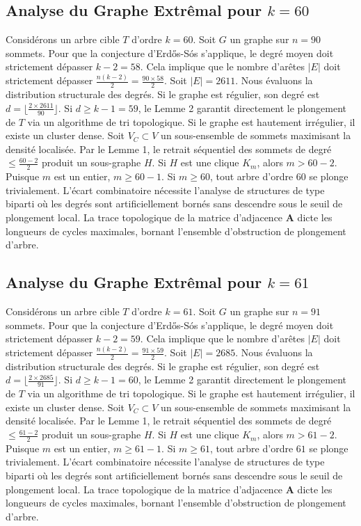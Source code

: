 \documentclass[11pt,a4paper]{article}
\begin{document}
\subsection{Analyse du Graphe Extr\^emal pour $k=60$}
Consid\'erons un arbre cible $T$ d'ordre $k=60$.
Soit $G$ un graphe sur $n=90$ sommets.
Pour que la conjecture d'Erd\H{o}s-S\'os s'applique, le degr\'e moyen doit strictement d\'epasser $k-2 = 58$.
Cela implique que le nombre d'ar\^etes $|E|$ doit strictement d\'epasser $\frac{n(k-2)}{2} = \frac{90 \times 58}{2}$.
Soit $|E| = 2611$.
Nous \'evaluons la distribution structurale des degr\'es. Si le graphe est r\'egulier, son degr\'e est $d = \lfloor \frac{2 \times 2611}{90} \rfloor$.
Si $d \geq k-1 = 59$, le Lemme 2 garantit directement le plongement de $T$ via un algorithme de tri topologique.
Si le graphe est hautement irr\'egulier, il existe un cluster dense. Soit $V_C \subset V$ un sous-ensemble de sommets maximisant la densit\'e localis\'ee.
Par le Lemme 1, le retrait s\'equentiel des sommets de degr\'e $\leq \frac{60-2}{2}$ produit un sous-graphe $H$.
Si $H$ est une clique $K_{m}$, alors $m > 60-2$. Puisque $m$ est un entier, $m \geq 60-1$. Si $m \geq 60$, tout arbre d'ordre $60$ se plonge trivialement.
L'\'ecart combinatoire n\'ecessite l'analyse de structures de type biparti o\`u les degr\'es sont artificiellement born\'es sans descendre sous le seuil de plongement local. La trace topologique de la matrice d'adjacence $\mathbf{A}$ dicte les longueurs de cycles maximales, bornant l'ensemble d'obstruction de plongement d'arbre.


\subsection{Analyse du Graphe Extr\^emal pour $k=61$}
Consid\'erons un arbre cible $T$ d'ordre $k=61$.
Soit $G$ un graphe sur $n=91$ sommets.
Pour que la conjecture d'Erd\H{o}s-S\'os s'applique, le degr\'e moyen doit strictement d\'epasser $k-2 = 59$.
Cela implique que le nombre d'ar\^etes $|E|$ doit strictement d\'epasser $\frac{n(k-2)}{2} = \frac{91 \times 59}{2}$.
Soit $|E| = 2685$.
Nous \'evaluons la distribution structurale des degr\'es. Si le graphe est r\'egulier, son degr\'e est $d = \lfloor \frac{2 \times 2685}{91} \rfloor$.
Si $d \geq k-1 = 60$, le Lemme 2 garantit directement le plongement de $T$ via un algorithme de tri topologique.
Si le graphe est hautement irr\'egulier, il existe un cluster dense. Soit $V_C \subset V$ un sous-ensemble de sommets maximisant la densit\'e localis\'ee.
Par le Lemme 1, le retrait s\'equentiel des sommets de degr\'e $\leq \frac{61-2}{2}$ produit un sous-graphe $H$.
Si $H$ est une clique $K_{m}$, alors $m > 61-2$. Puisque $m$ est un entier, $m \geq 61-1$. Si $m \geq 61$, tout arbre d'ordre $61$ se plonge trivialement.
L'\'ecart combinatoire n\'ecessite l'analyse de structures de type biparti o\`u les degr\'es sont artificiellement born\'es sans descendre sous le seuil de plongement local. La trace topologique de la matrice d'adjacence $\mathbf{A}$ dicte les longueurs de cycles maximales, bornant l'ensemble d'obstruction de plongement d'arbre.
\end{document}
